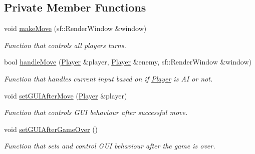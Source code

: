 \subsection*{Private Member Functions}
\begin{DoxyCompactItemize}
\item 
void \hyperlink{classMultiplayer__State_a21ecdd3177fd35cba51603d1d17d53c1}{make\+Move} (sf\+::\+Render\+Window \&window)
\begin{DoxyCompactList}\small\item\em Function that controls all players turns. \end{DoxyCompactList}\item 
bool \hyperlink{classMultiplayer__State_a6797a4f7a4c3ab4fa18b357156073274}{handle\+Move} (\hyperlink{classPlayer}{Player} \&player, \hyperlink{classPlayer}{Player} \&enemy, sf\+::\+Render\+Window \&window)
\begin{DoxyCompactList}\small\item\em Function that handles current input based on if \hyperlink{classPlayer}{Player} is AI or not. \end{DoxyCompactList}\item 
void \hyperlink{classMultiplayer__State_afeede160f90a08044468b107432d388d}{set\+G\+U\+I\+After\+Move} (\hyperlink{classPlayer}{Player} \&player)
\begin{DoxyCompactList}\small\item\em Function that controls G\+UI behaviour after successful move. \end{DoxyCompactList}\item 
void \hyperlink{classMultiplayer__State_ac2cbc737ae1ae37ef04f47bf52333633}{set\+G\+U\+I\+After\+Game\+Over} ()\hypertarget{classMultiplayer__State_ac2cbc737ae1ae37ef04f47bf52333633}{}\label{classMultiplayer__State_ac2cbc737ae1ae37ef04f47bf52333633}

\begin{DoxyCompactList}\small\item\em Function that sets and control G\+UI behaviour after the game is over. \end{DoxyCompactList}\end{DoxyCompactItemize}
